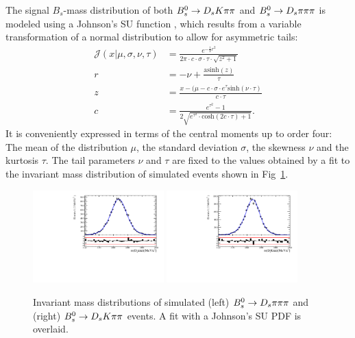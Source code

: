 The signal $B_s$-mass distribution of both ${{B}^0_{s}}\rightarrow{\ensuremath{{D}_{s}}}{\ensuremath{K}}{\ensuremath{\pi}}{\ensuremath{\pi}}$ and ${{B}^0_{s}}\rightarrow{\ensuremath{{D}_{s}}}{\ensuremath{\pi}}{\ensuremath{\pi}}{\ensuremath{\pi}}$  is modeled using a Johnson's SU function \cite{10.2307/2332539}, which 
results from a variable transformation of a normal distribution to allow for asymmetric tails:
\begin{align}
\mathcal J(x\vert\mu,\sigma,\nu,\tau) &=
\frac{e^{- \frac{1}{2} r^2}}{2\pi \cdot c \cdot \sigma \cdot \tau \cdot \sqrt{z^2+1}} \\
r &= - \nu + \frac{\text{asinh}(z)}{\tau} \\
z & = \frac{x-(\mu - c \cdot \sigma \cdot e^\tau \text{sinh}(\nu\cdot \tau)}{c \cdot \tau} \\
c &= \frac{e^{\tau^2}-1}{2\sqrt{e^{\tau^2} \cdot \text{cosh}(2 c \cdot \tau)+1}} .
\label{eq:RooJohnsonSU}
\end{align}
It is conveniently expressed in terms of the central moments up to order four: 
The mean of the distribution $\mu$, the standard deviation $\sigma$,
the skewness $\nu$ and the kurtosis $\tau$.
The tail parameters $\nu$ and $\tau$ are fixed to the values obtained by a fit to the invariant mass distribution of simulated events shown in Fig~\ref{fig: BsMassShapes}. 
\begin{figure}[h]
\centering
\includegraphics[height=!,width=0.45\textwidth]{figs/MassFit/normMC_pull.pdf} \hfill
\includegraphics[height=!,width=0.45\textwidth]{figs/MassFit/signalMC_pull.pdf}
\caption{Invariant mass distributions of simulated (left) ${{B}^0_{s}}\rightarrow{\ensuremath{{D}_{s}}}{\ensuremath{\pi}}{\ensuremath{\pi}}{\ensuremath{\pi}}$ and (right) ${{B}^0_{s}}\rightarrow{\ensuremath{{D}_{s}}}{\ensuremath{K}}{\ensuremath{\pi}}{\ensuremath{\pi}}$ events. A fit with a Johnson's SU PDF is overlaid.}
\label{fig: BsMassShapes}
\end{figure}
